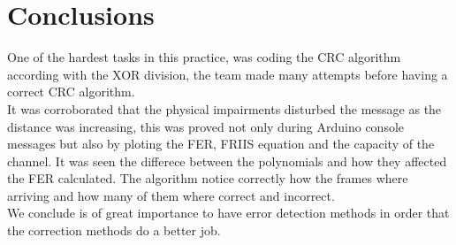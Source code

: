 \section{Conclusions}

One of the hardest tasks in this practice, was coding the CRC algorithm according with the XOR division, the team made many attempts before having a correct CRC algorithm. \\

It was corroborated that the physical impairments disturbed the message as the distance was increasing, this was proved not only  during Arduino console messages but also by ploting the FER, FRIIS equation and the capacity of the channel. It was seen the differece between the polynomials and how they affected the FER calculated.  The algorithm notice correctly how the frames where arriving and how many of them where correct and incorrect.\\

 We conclude  is of great importance to have error detection methods in order that the  correction methods do a better job.